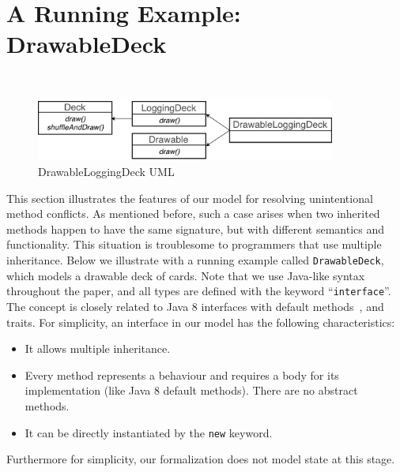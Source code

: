 \section{A Running Example: DrawableDeck}~\label{sec:overview}

\begin{figure}[t]
\centering
\includegraphics[height=2cm]{pics/DrawableLoggingDeck.pdf}
\caption{DrawableLoggingDeck UML}\label{fig:subtyping}
\end{figure}

This section illustrates the features of our \MIM{} model for
resolving unintentional method conflicts. As mentioned before, such a
case arises when two inherited methods happen to have the same
signature, but with different semantics and functionality. This
situation is troublesome to programmers that use multiple
inheritance. Below we illustrate with a running example called
\lstinline|DrawableDeck|, which models a drawable deck of cards. 
Note that we use Java-like syntax
throughout the paper, and all types are defined with the keyword
``\lstinline|interface|''. The concept is closely related to Java 8
interfaces with default methods~\cite{}, and traits. For simplicity, an interface in our model has
the following characteristics:
\begin{itemize}
	\item It allows multiple inheritance.
	\item Every method represents a behaviour and requires a body for its implementation (like Java 8 default methods). There are no abstract methods.
	\item It can be directly instantiated by the \lstinline|new| keyword.
\end{itemize}
Furthermore for simplicity, our formalization does not model state at
this stage. %

